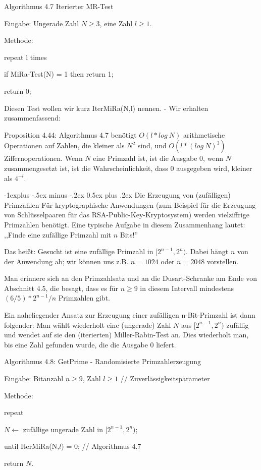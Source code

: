 \documentclass[a4paper]{article}
\makeatletter
\renewcommand{\subsection}{\@startsection{subsection}{2}{0mm}%
 {-1explus -.5ex minus -.2ex}%
 {0.5ex plus .2ex}%
 {\normalfont\normalsize\bfseries}}
\makeatother
\begin{document}
\begin{multicols}{3}
        Algorithmus 4.7 Iterierter MR-Test
        \begin{itemize*}
            \item Eingabe: Ungerade Zahl $N\geq 3$, eine Zahl $l\geq 1$.
            \item Methode:
            \item repeat l times
            \item if MiRa-Test(N) = 1 then return 1;
            \item return 0;
        \end{itemize*}

        Diesen Test wollen wir kurz IterMiRa(N,l) nennen. - Wir erhalten zusammenfassend:

        Proposition 4.44: Algorithmus 4.7 benötigt $O(l*log\ N)$ arithmetische Operationen auf Zahlen, die kleiner als $N^2$ sind, und $O(l*(log\ N)^3)$ Ziffernoperationen. Wenn $N$ eine Primzahl ist, ist die Ausgabe $0$, wenn $N$ zusammengesetzt ist, ist die Wahrscheinlichkeit, dass $0$ ausgegeben wird, kleiner als $4^{-l}$.

        \subsection{Die Erzeugung von (zufälligen) Primzahlen}
        Für kryptographische Anwendungen (zum Beispiel für die Erzeugung von Schlüsselpaaren für das RSA-Public-Key-Kryptosystem) werden vielziffrige Primzahlen benötigt. Eine typische Aufgabe in diesem Zusammenhang lautet: ,,Finde eine zufällige Primzahl mit $n$ Bits!''

        Das heißt: Gesucht ist eine zufällige Primzahl in $[2^{n-1}, 2^n)$. Dabei hängt $n$ von der Anwendung ab; wir können uns z.B. $n=1024$ oder $n=2048$ vorstellen.

        Man erinnere sich an den Primzahlsatz und an die Dusart-Schranke am Ende von Abschnitt 4.5, die besagt, dass es für $n\geq 9$ in diesem Intervall mindestens $(6/5)*
    2^{n-1}/n$ Primzahlen gibt.

        Ein naheliegender Ansatz zur Erzeugung einer zufälligen n-Bit-Primzahl ist dann folgender: Man wählt wiederholt eine (ungerade) Zahl $N$ aus $[2^{n-1}, 2^n)$ zufällig und wendet auf sie den (iterierten) Miller-Rabin-Test an. Dies wiederholt man, bis eine Zahl gefunden wurde, die die Ausgabe $0$ liefert.

        Algorithmus 4.8: GetPrime - Randomisierte Primzahlerzeugung
        \begin{itemize*}
            \item Eingabe: Bitanzahl $n\geq 9$, Zahl $l\geq 1$ // Zuverlässigkeitsparameter
            \item Methode:
            \item repeat
            \item $N\leftarrow$ zufällige ungerade Zahl in $[2^{n-1}, 2^n)$;
            \item until IterMiRa(N,$l$) = 0; // Algorithmus 4.7
            \item return $N$.
        \end{itemize*}


\end{multicols}
\end{document}
